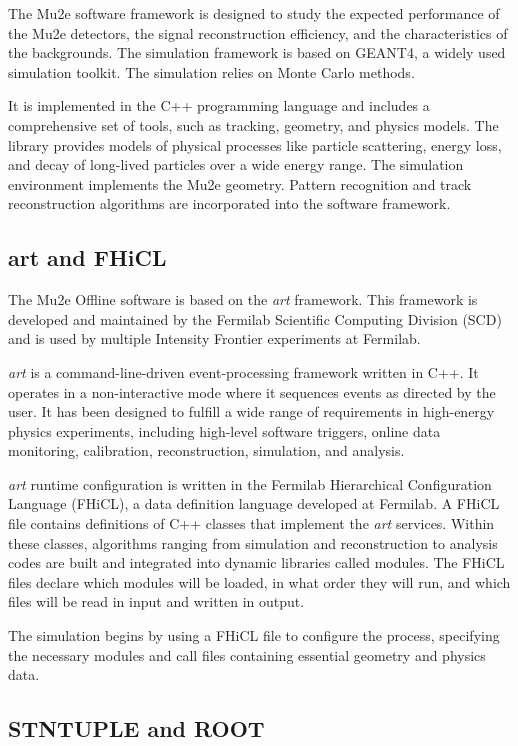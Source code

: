 The Mu2e software framework is designed to study the expected performance of the Mu2e detectors, the signal reconstruction efficiency, and the characteristics of the backgrounds. The simulation framework is based on GEANT4, a widely used simulation toolkit. The simulation relies on Monte Carlo methods.

It is implemented in the C++ programming language and includes a comprehensive set of tools, such as tracking, geometry, and physics models. The library provides models of physical processes like particle scattering, energy loss, and decay of long-lived particles over a wide energy range. The simulation environment implements the Mu2e geometry. Pattern recognition and track reconstruction algorithms are incorporated into the software framework.

\subsection{art and FHiCL}

The Mu2e Offline software is based on the \textit{art} framework. This framework is developed and maintained by the Fermilab Scientific Computing Division (SCD) and is used by multiple Intensity Frontier experiments at Fermilab.

\textit{art} is a command-line-driven event-processing framework written in C++. It operates in a non-interactive mode where it sequences events as directed by the user. It has been designed to fulfill a wide range of requirements in high-energy physics experiments, including high-level software triggers, online data monitoring, calibration, reconstruction, simulation, and analysis.

\textit{art} runtime configuration is written in the Fermilab Hierarchical Configuration Language (FHiCL), a data definition language developed at Fermilab. A FHiCL file contains definitions of C++ classes that implement the \textit{art} services. Within these classes, algorithms ranging from simulation and reconstruction to analysis codes are built and integrated into dynamic libraries called modules. The FHiCL files declare which modules will be loaded, in what order they will run, and which files will be read in input and written in output.

The simulation begins by using a FHiCL file to configure the process, specifying the necessary modules and call files containing essential geometry and physics data.

\subsection{STNTUPLE and ROOT}

